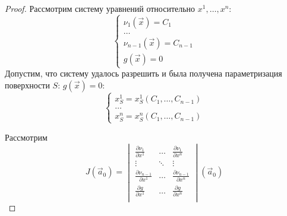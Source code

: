 \begin{proof}
    Рассмотрим систему уравнений относительно $x^1, \dots, x^n$:
    \begin{equation}
    	\begin{cases}
    		\nu_1 \left( \vec{x} \right) = C_1             \\
    		\dots                                                     \\
    		\nu_{n - 1} \left( \vec{x} \right) = C_{n - 1} \\
    		g \left( \vec{x} \right) = 0
    	\end{cases}
    	\label{part_eq_5}
    \end{equation}
    Допустим, что систему удалось разрешить и была получена параметризация поверхности $S$: $g \left( \vec{x} \right) = 0$:
    \begin{equation*}
    	\begin{cases}
    		x^1_S = x^1_S \left( C_1, \dots, C_{n - 1} \right) \\
    		\dots                                              \\
    		x^n_S = x^n_S \left( C_1, \dots, C_{n - 1} \right)
    	\end{cases}
    \end{equation*}

    Рассмотрим
    \begin{equation*}
    	J \left( \vec{a}_0 \right) =
    	\begin{vmatrix}
    		\displaystyle \frac{\partial \nu_1}{\partial x^1} & \dots & \displaystyle \frac{\partial \nu_1}{\partial x^n}             \\
    		\vdots & \ddots & \vdots                                                                                          \\
    		\displaystyle \frac{\partial \nu_{n - 1}}{\partial x^1} & \dots & \displaystyle \frac{\partial \nu_{n - 1}}{\partial x^n} \\
    		\displaystyle \frac{\partial g}{\partial x^1} & \dots & \displaystyle \frac{\partial g}{\partial x^n}                     \\
    	\end{vmatrix}  \left( \vec{a}_0 \right)
    \end{equation*}
    

\end{proof}
